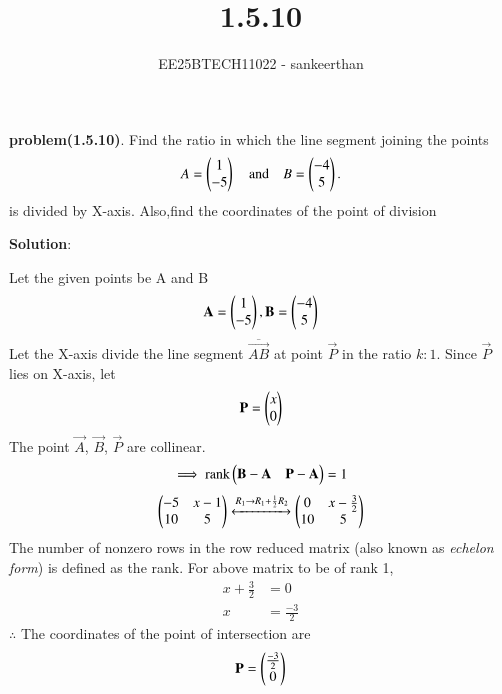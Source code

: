 \documentclass[journal]{IEEEtran}
\begin{document}



\title{1.5.10}
\author{EE25BTECH11022 - sankeerthan}
{\let\newpage\relax\maketitle}

\renewcommand{\thefigure}{\theenumi}
\renewcommand{\thetable}{\theenumi}
\setlength{\intextsep}{10pt} %


\renewcommand{\thetable}{\theenumi}


\textbf{problem(1.5.10)}.
Find the ratio in which the line segment joining the points 
\begin{align}
    A=\begin{pmatrix}1\\-5\end{pmatrix} \quad \text{and} \quad B=\begin{pmatrix}-4\\5\end{pmatrix}.
\end{align} is divided by X-axis. Also,find the coordinates of the  point of division

\textbf{Solution}:

Let the given points be A and B
\begin{align*} \mathbf{A} = \begin{pmatrix}1 \\ -5\end{pmatrix}, \mathbf{B} = \begin{pmatrix}-4 \\ 5\end{pmatrix} \end{align*}
Let the X-axis divide the line segment \(\overline{\vec{AB}}\) at point $\vec{P}$ in the ratio $k:1$.
Since $\vec{P}$ lies on X-axis, let
\begin{align*}
\mathbf{P} = \begin{pmatrix}x \\ 0\end{pmatrix}
\end{align*}
The point $\vec{A}$, $\vec{B}$, $\vec{P}$ are collinear.
\begin{align}
\implies \text{rank}\begin{pmatrix}\mathbf{B}-\mathbf{A} & \mathbf{P}-\mathbf{A}\end{pmatrix} = 1
\end{align}
\begin{align}
\begin{pmatrix}-5 & x-1 \\ 10 & 5\end{pmatrix} \xleftrightarrow{R_1 \rightarrow {R_1 + \frac{1}{2}R_2}}\begin{pmatrix}0 & x-\frac{3}{2} \\ 10 & 5\end{pmatrix}  
\end{align}
The number of nonzero rows in the row reduced matrix (also known as {\em echelon form}) is defined as the rank. For above matrix to be of rank 1,
\begin{align}
x+\frac{3}{2} &= 0 \\
x &= \frac{-3}{2}
\end{align}
$\therefore$ The coordinates of the point of intersection are 
\begin{align*}
\mathbf{P} = \begin{pmatrix}\frac{-3}{2} \\ 0\end{pmatrix}
\end{align*}
\end{document}
